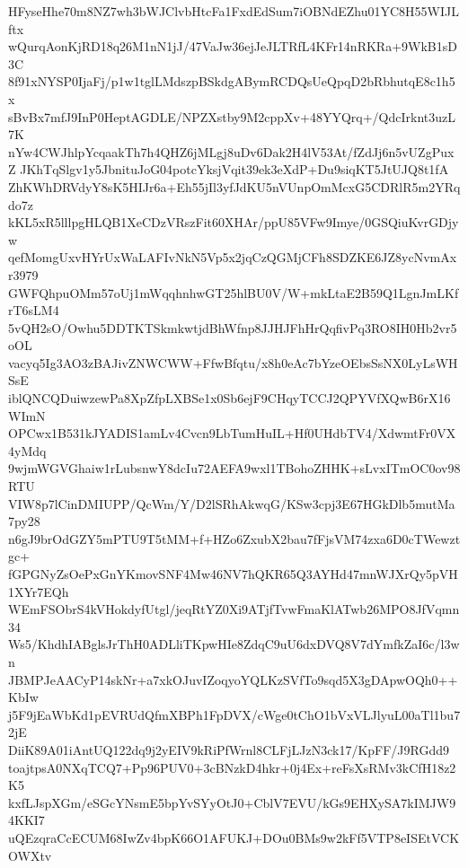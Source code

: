 HFyseHhe70m8NZ7wh3bWJClvbHtcFa1FxdEdSum7iOBNdEZhu01YC8H55WIJLftx
wQurqAonKjRD18q26M1nN1jJ/47VaJw36ejJeJLTRfL4KFr14nRKRa+9WkB1sD3C
8f91xNYSP0IjaFj/p1w1tglLMdszpBSkdgABymRCDQsUeQpqD2bRbhutqE8c1h5x
sBvBx7mfJ9InP0HeptAGDLE/NPZXstby9M2cppXv+48YYQrq+/QdcIrknt3uzL7K
nYw4CWJhlpYcqaakTh7h4QHZ6jMLgj8uDv6Dak2H4lV53At/fZdJj6n5vUZgPuxZ
JKhTqSlgv1y5JbnituJoG04potcYksjVqit39ek3eXdP+Du9siqKT5JtUJQ8t1fA
ZhKWhDRVdyY8sK5HIJr6a+Eh55jIl3yfJdKU5nVUnpOmMcxG5CDRlR5m2YRqdo7z
kKL5xR5lllpgHLQB1XeCDzVRszFit60XHAr/ppU85VFw9Imye/0GSQiuKvrGDjyw
qefMomgUxvHYrUxWaLAFIvNkN5Vp5x2jqCzQGMjCFh8SDZKE6JZ8ycNvmAxr3979
GWFQhpuOMm57oUj1mWqqhnhwGT25hlBU0V/W+mkLtaE2B59Q1LgnJmLKfrT6sLM4
5vQH2sO/Owhu5DDTKTSkmkwtjdBhWfnp8JJHJFhHrQqfivPq3RO8IH0Hb2vr5oOL
vacyq5Ig3AO3zBAJivZNWCWW+FfwBfqtu/x8h0eAc7bYzeOEbsSsNX0LyLsWHSsE
iblQNCQDuiwzewPa8XpZfpLXBSe1x0Sb6ejF9CHqyTCCJ2QPYVfXQwB6rX16WImN
OPCwx1B531kJYADIS1amLv4Cvcn9LbTumHuIL+Hf0UHdbTV4/XdwmtFr0VX4yMdq
9wjmWGVGhaiw1rLubsnwY8dcIu72AEFA9wxl1TBohoZHHK+sLvxITmOC0ov98RTU
VIW8p7lCinDMIUPP/QcWm/Y/D2lSRhAkwqG/KSw3cpj3E67HGkDlb5mutMa7py28
n6gJ9brOdGZY5mPTU9T5tMM+f+HZo6ZxubX2bau7fFjsVM74zxa6D0cTWewztgc+
fGPGNyZsOePxGnYKmovSNF4Mw46NV7hQKR65Q3AYHd47mnWJXrQy5pVH1XYr7EQh
WEmFSObrS4kVHokdyfUtgl/jeqRtYZ0Xi9ATjfTvwFmaKlATwb26MPO8JfVqmn34
Ws5/KhdhIABglsJrThH0ADLliTKpwHIe8ZdqC9uU6dxDVQ8V7dYmfkZaI6c/l3wn
JBMPJeAACyP14skNr+a7xkOJuvIZoqyoYQLKzSVfTo9sqd5X3gDApwOQh0++KbIw
j5F9jEaWbKd1pEVRUdQfmXBPh1FpDVX/cWge0tChO1bVxVLJlyuL00aTl1bu72jE
DiiK89A01iAntUQ122dq9j2yEIV9kRiPfWrnl8CLFjLJzN3ck17/KpFF/J9RGdd9
toajtpsA0NXqTCQ7+Pp96PUV0+3cBNzkD4hkr+0j4Ex+reFsXsRMv3kCfH18z2K5
kxfLJspXGm/eSGcYNsmE5bpYvSYyOtJ0+CblV7EVU/kGs9EHXySA7kIMJW94KKI7
uQEzqraCcECUM68IwZv4bpK66O1AFUKJ+DOu0BMs9w2kFf5VTP8eISEtVCKOWXtv
